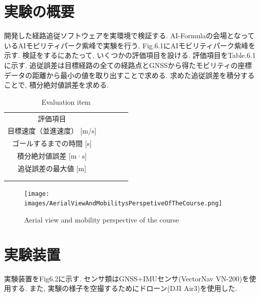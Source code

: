 
\section{実験の概要}
開発した経路追従ソフトウェアを実環境で検証する.
AI-Formulaの会場となっているAIモビリティパーク紫峰で実験を行う.
Fig.6.1にAIモビリティパーク紫峰を示す.
検証をするにあたって, いくつかの評価項目を設ける. 
評価項目をTable.6.1に示す.
追従誤差は目標経路の全ての経路点とGNSSから得たモビリティの座標データの距離から最小の値を取り出すことで求める.
求めた追従誤差を積分することで, 積分絶対値誤差を求める.

\begin{table}[H]
  \centering
  \caption{Evaluation item}
  \begin{tabular}{cclll}
  \cline{1-1}
  評価項目                    &  &  &  &  \\
  \cline{1-2}
  目標速度（並進速度） {[}m/s{]}    &  &  &  &  \\
  ゴールするまでの時間 {[}s{]}            &  &  &  &  \\
  積分絶対値誤差 {[}m·s{]} &  &  &  &  \\
  追従誤差の最大値 {[}m{]}  &  &  &  &  \\
  \multicolumn{1}{l}{}    &  &  &  &  \\
  \multicolumn{1}{l}{}    &  &  &  & 
  \end{tabular}
\end{table}


\begin{figure}[H]
  \centering
 \texttt{[image: images/AerialViewAndMobilitysPerspetiveOfTheCourse.png]}
 \caption{Aerial view and mobility perspective of the course}
 \label{fig:course}
\end{figure}

\section{実験装置}
実験装置をFig6.2に示す.
センサ類はGNSS+IMUセンサ(VectorNav VN-200)を使用する.
また, 実験の様子を空撮するためにドローン(DJI Air3)を使用した.

